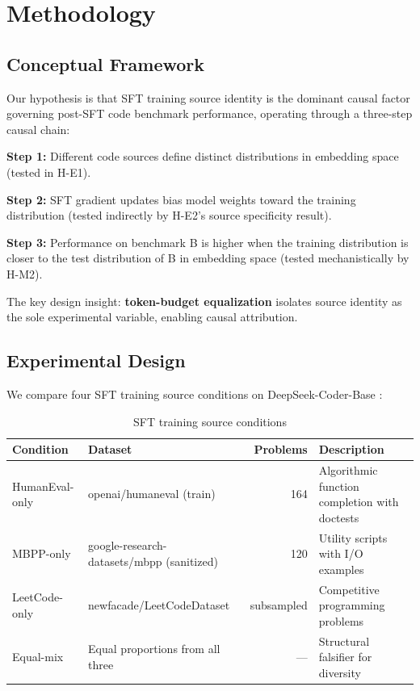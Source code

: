 \section{Methodology}
\label{sec:method}

\subsection{Conceptual Framework}

Our hypothesis is that SFT training source identity is the dominant causal factor governing
post-SFT code benchmark performance, operating through a three-step causal chain:

\textbf{Step 1:} Different code sources define distinct distributions in embedding space (tested in H-E1).

\textbf{Step 2:} SFT gradient updates bias model weights toward the training distribution (tested indirectly by H-E2's source specificity result).

\textbf{Step 3:} Performance on benchmark B is higher when the training distribution is closer to
the test distribution of B in embedding space (tested mechanistically by H-M2).

The key design insight: \textbf{token-budget equalization} isolates source identity as the sole
experimental variable, enabling causal attribution.

\subsection{Experimental Design}

We compare four SFT training source conditions on DeepSeek-Coder-Base \cite{Guo2024DeepSeekCoder}:

\begin{table}[h]
\centering
\caption{SFT training source conditions}
\label{tab:conditions}
\begin{tabular}{llrl}
\toprule
Condition & Dataset & Problems & Description \\
\midrule
HumanEval-only & openai/humaneval (train) & 164 & Algorithmic function completion with doctests \\
MBPP-only & google-research-datasets/mbpp (sanitized) & 120 & Utility scripts with I/O examples \\
LeetCode-only & newfacade/LeetCodeDataset & subsampled & Competitive programming problems \\
Equal-mix & Equal proportions from all three & --- & Structural falsifier for diversity \\
\bottomrule
\end{tabular}
\end{table}

